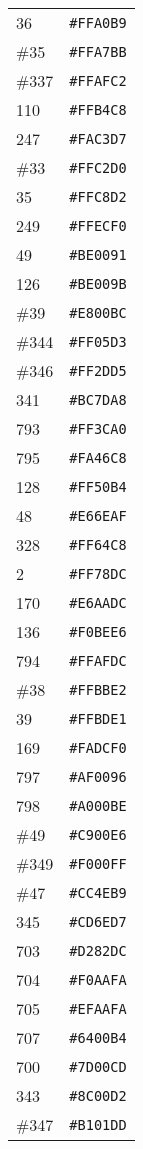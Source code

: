 \documentclass[a4paper]{article}
\begin{document}
\begin{longtable}{|l|r|}
36 & \texttt{\#FFA0B9} \\
\#35 & \texttt{\#FFA7BB} \\
\#337 & \texttt{\#FFAFC2} \\
110 & \texttt{\#FFB4C8} \\
247 & \texttt{\#FAC3D7} \\
\#33 & \texttt{\#FFC2D0} \\
35 & \texttt{\#FFC8D2} \\
249 & \texttt{\#FFECF0} \\
49 & \texttt{\#BE0091} \\
126 & \texttt{\#BE009B} \\
\#39 & \texttt{\#E800BC} \\
\#344 & \texttt{\#FF05D3} \\
\#346 & \texttt{\#FF2DD5} \\
341 & \texttt{\#BC7DA8} \\
793 & \texttt{\#FF3CA0} \\
795 & \texttt{\#FA46C8} \\
128 & \texttt{\#FF50B4} \\
48 & \texttt{\#E66EAF} \\
328 & \texttt{\#FF64C8} \\
2 & \texttt{\#FF78DC} \\
170 & \texttt{\#E6AADC} \\
136 & \texttt{\#F0BEE6} \\
794 & \texttt{\#FFAFDC} \\
\#38 & \texttt{\#FFBBE2} \\
39 & \texttt{\#FFBDE1} \\
169 & \texttt{\#FADCF0} \\
797 & \texttt{\#AF0096} \\
798 & \texttt{\#A000BE} \\
\#49 & \texttt{\#C900E6} \\
\#349 & \texttt{\#F000FF} \\
\#47 & \texttt{\#CC4EB9} \\
345 & \texttt{\#CD6ED7} \\
703 & \texttt{\#D282DC} \\
704 & \texttt{\#F0AAFA} \\
705 & \texttt{\#EFAAFA} \\
707 & \texttt{\#6400B4} \\
700 & \texttt{\#7D00CD} \\
343 & \texttt{\#8C00D2} \\
\#347 & \texttt{\#B101DD} \\

\end{longtable}
\end{document}
